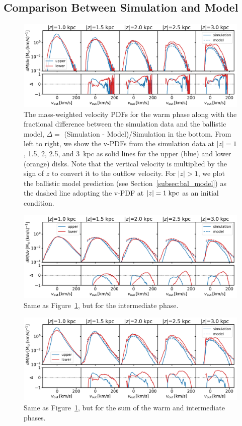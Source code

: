 \documentclass[twocolumn]{aastex62}
\newcommand\kpc{\;{\rm kpc}}
\begin{document}
\subsection{Comparison Between Simulation and Model}\label{subsec:bal_comparison}
\begin{figure}
	\centering
	\includegraphics[width=\textwidth]{ballistic_warm.pdf}
	\caption{The mass-weighted velocity PDFs for the warm phase along with the fractional difference between the simulation data and the ballistic model, $\Delta=$ (Simulation - Model)/Simulation in the bottom. From left to right, we show the v-PDFs from the simulation data at $|z|=1$, 1.5, 2, 2.5, and 3~kpc as solid lines for the upper (blue) and lower (orange) disks. Note that the vertical velocity is multiplied by the sign of $z$ to convert it to the outflow velocity. For $|z|>1$, we plot the ballistic model prediction (see Section~\ref{subsec:bal_model}) as the dashed line adopting the v-PDF at $|z|=1\kpc$ as an initial condition.
 } 
	\label{fig:ballistic_warm}
\end{figure}

\begin{figure}
	\centering
	\includegraphics[width=\textwidth]{ballistic_int.pdf}
	\caption{Same as Figure~\ref{fig:ballistic_warm}, but for the intermediate phase.} 
	\label{fig:ballistic_int}
\end{figure}

\begin{figure}
	\centering
	\includegraphics[width=\textwidth]{ballistic_warm_int.pdf}
	\caption{Same as Figure~\ref{fig:ballistic_warm}, but for the sum of the warm and intermediate phases.} 
	\label{fig:ballistic_warm_int}
\end{figure}
\end{document}
